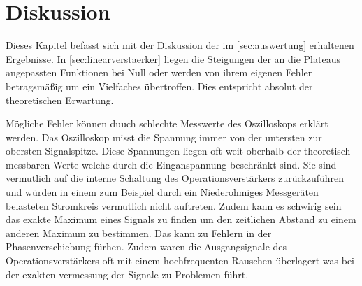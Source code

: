 

\section{Diskussion}
\label{sec:Diskussion}

Dieses Kapitel befasst sich mit der Diskussion der im \autoref{sec:auswertung} erhaltenen Ergebnisse.
In \autoref{sec:linearverstaerker} liegen die Steigungen der an die Plateaus angepassten Funktionen
bei Null oder werden von ihrem eigenen Fehler betragsmäßig um ein Vielfaches übertroffen. Dies entspricht
absolut der theoretischen Erwartung.





Mögliche Fehler können duuch schlechte Messwerte des Oszilloskops erklärt werden. Das Oszilloskop misst 
die Spannung immer von der untersten zur obersten Signalspitze. Diese Spannungen liegen oft weit oberhalb 
der theoretisch messbaren Werte welche durch die Einganspannung beschränkt sind. Sie sind vermutlich auf 
die interne Schaltung des Operationsverstärkers zurückzuführen und würden in einem zum Beispiel
durch ein Niederohmiges Messgeräten belasteten Stromkreis vermutlich nicht auftreten. Zudem kann es schwirig
sein das exakte Maximum eines Signals zu finden um den zeitlichen Abstand zu einem anderen Maximum zu bestimmen.
Das kann zu Fehlern in der Phasenverschiebung fürhen. Zudem waren die Ausgangsignale des Operationsverstärkers
oft mit einem hochfrequenten Rauschen überlagert was bei der exakten vermessung der Signale zu Problemen führt.
























